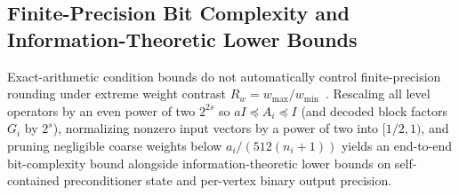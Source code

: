 \documentclass[10pt]{article}
\begin{document}
\subsection{Finite-Precision Bit Complexity and Information-Theoretic Lower Bounds}
Exact-arithmetic condition bounds do not automatically control finite-precision rounding under extreme weight contrast $R_w = w_{\max}/w_{\min}$~\cite{mccormick2021mixed,mccormick2023rounding}. Rescaling all level operators by an even power of two $2^{2s}$ so $a I \preceq A_i \preceq I$ (and decoded block factors $G_i$ by $2^s$), normalizing nonzero input vectors by a power of two into $[1/2, 1)$, and pruning negligible coarse weights below $a_i/(512(n_i + 1))$ yields an end-to-end bit-complexity bound alongside information-theoretic lower bounds on self-contained preconditioner state and per-vertex binary output precision.
\end{document}
